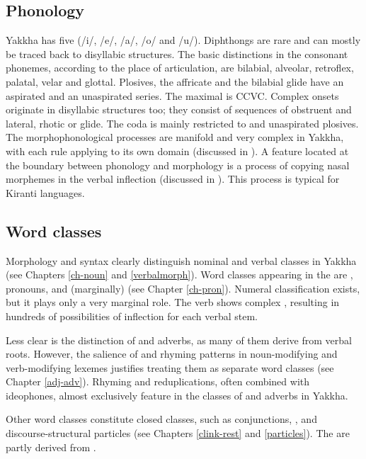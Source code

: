 \subsection{Phonology}

Yakkha has five  (/i/, /e/, /a/, /o/ and /u/). Diphthongs are rare and can mostly be traced back to disyllabic structures. The basic distinctions in the consonant phonemes, according to  the place of articulation, are bilabial, alveolar, retroflex, palatal, velar and glottal. Plosives, the affricate and the bilabial glide have an aspirated and an unaspirated series. The maximal  is CCVC. Complex onsets originate in disyllabic structures too; they consist of sequences of obstruent and lateral, rhotic or glide. The  coda is mainly restricted to  and unaspirated plosives. The morphophonological processes are manifold and very complex in Yakkha, with each rule applying to its own domain (discussed in ). A feature located at the boundary between phonology and morphology is a process of copying nasal morphemes in the verbal inflection (discussed in ). This process is typical for Kiranti languages.


\subsection{Word classes}

Morphology and syntax clearly distinguish nominal and verbal classes in Yakkha (see Chapters \ref{ch-noun} and \ref{verbalmorph}). Word classes appearing in the  are , pronouns,   and (marginally)  (see Chapter \ref{ch-pron}). Numeral classification exists, but it plays only a very marginal role. The verb shows complex , resulting in hundreds of possibilities of inflection for each verbal stem. 


Less clear is the distinction of  and adverbs, as many of them derive from verbal roots. However, the salience of  and rhyming patterns in noun-modifying and verb-modifying lexemes justifies treating them as separate word classes (see Chapter \ref{adj-adv}). Rhyming and reduplications, often combined with ideophones, almost exclusively feature in the classes of  and adverbs in Yakkha.


Other word classes constitute closed classes, such as conjunctions, ,  and discourse-structural particles (see Chapters  \ref{clink-rest} and \ref{particles}). The  are partly derived from . 



